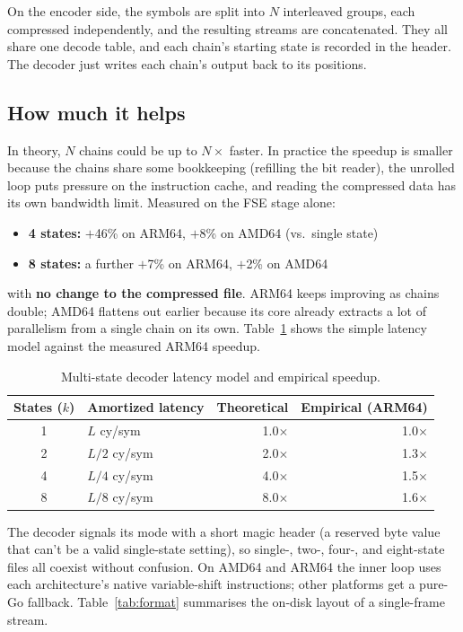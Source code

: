 \documentclass[11pt]{article}
\begin{document}
On the encoder side, the symbols are split into $N$ interleaved groups, each
compressed independently, and the resulting streams are concatenated. They
all share one decode table, and each chain's starting state is recorded in
the header. The decoder just writes each chain's output back to its
positions.

\subsection{How much it helps}

In theory, $N$ chains could be up to $N\times$ faster. In practice the speedup
is smaller because the chains share some bookkeeping (refilling the bit
reader), the unrolled loop puts pressure on the instruction cache, and reading
the compressed data has its own bandwidth limit. Measured on the FSE stage
alone:

\begin{itemize}
  \item \textbf{4 states:} $+$46\% on ARM64, $+$8\% on AMD64 (vs.\ single
  state)
  \item \textbf{8 states:} a further $+$7\% on ARM64, $+$2\% on AMD64
\end{itemize}

with \textbf{no change to the compressed file}. ARM64 keeps improving as chains
double; AMD64 flattens out earlier because its core already extracts a lot of
parallelism from a single chain on its own. Table~\ref{tab:latency} shows the
simple latency model against the measured ARM64 speedup.

\begin{table}[htbp]
\centering
\caption{Multi-state decoder latency model and empirical speedup.}
\label{tab:latency}
\begin{tabular}{clrr}
\toprule
States ($k$) & Amortized latency & Theoretical & Empirical (ARM64) \\
\midrule
1 & $L$ cy/sym & 1.0$\times$ & 1.0$\times$ \\
2 & $L/2$ cy/sym & 2.0$\times$ & 1.3$\times$ \\
4 & $L/4$ cy/sym & 4.0$\times$ & 1.5$\times$ \\
8 & $L/8$ cy/sym & 8.0$\times$ & 1.6$\times$ \\
\bottomrule
\end{tabular}
\end{table}

The decoder signals its mode with a short magic header (a reserved byte
value that can't be a valid single-state setting), so single-, two-, four-,
and eight-state files all coexist without confusion. On AMD64 and ARM64 the
inner loop uses each architecture's native variable-shift instructions; other
platforms get a pure-Go fallback. Table~\ref{tab:format} summarises the
on-disk layout of a single-frame stream.
\end{document}
